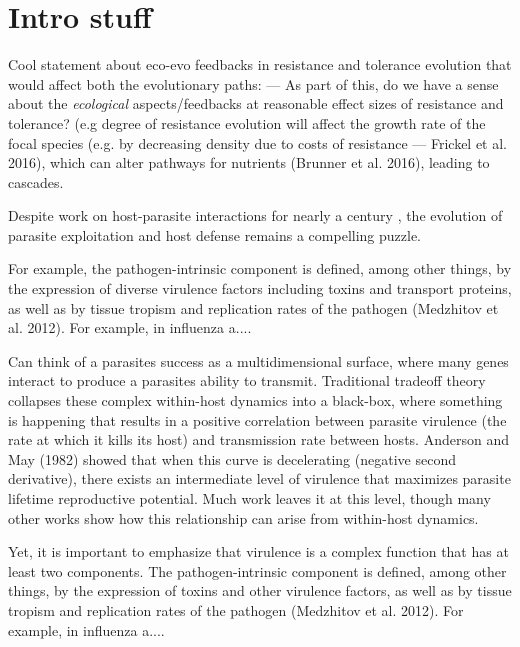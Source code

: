 \section*{Intro stuff}

Cool statement about eco-evo feedbacks in resistance and tolerance evolution that would affect both the evolutionary paths: --- As part of this, do we have a sense about the \emph{ecological} aspects/feedbacks at reasonable effect sizes of resistance and tolerance? (e.g degree of resistance evolution will affect the growth rate of the focal species (e.g. by decreasing density due to costs of resistance --- Frickel et al. 2016), which can alter pathways for nutrients (Brunner et al. 2016), leading to cascades.

Despite work on host-parasite interactions for nearly a century \citep{Kostitzin1934, Ball1943}, the evolution of parasite exploitation and host defense remains a compelling puzzle. 

For example, the pathogen-intrinsic component is defined, among other things, by the expression of diverse virulence factors including toxins and transport proteins, as well as by tissue tropism and replication rates of the pathogen (Medzhitov et al. 2012). For example, in influenza a....

Can think of a parasites success as a multidimensional surface, where many genes interact to produce a parasites ability to transmit. Traditional tradeoff theory collapses these complex within-host dynamics into a black-box, where something is happening that results in a positive correlation between parasite virulence (the rate at which it kills its host) and transmission rate between hosts. Anderson and May (1982) showed that when this curve is decelerating (negative second derivative), there exists an intermediate level of virulence that maximizes parasite lifetime reproductive potential. Much work leaves it at this level, though many other works show how this relationship can arise from within-host dynamics. 

Yet, it is important to emphasize that virulence is a complex function that has at least two components. The pathogen-intrinsic component is defined, among other things, by the expression of toxins and other virulence factors, as well as by tissue tropism and replication rates of the pathogen (Medzhitov et al. 2012). For example, in influenza a....

